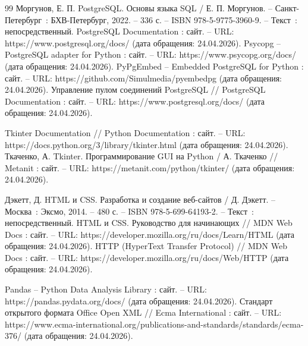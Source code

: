 \begin{thebibliography}{99}
	 Моргунов, Е. П. PostgreSQL. Основы языка SQL / Е. П. Моргунов. -- Санкт-Петербург~: БХВ-Петербург, 2022. -- 336 с. -- ISBN 978-5-9775-3960-9. -- Текст~: непосредственный.
	 PostgreSQL Documentation : сайт. -- URL: https://www.postgresql.org/docs/ (дата обращения: 24.04.2026).
	 Psycopg -- PostgreSQL adapter for Python : сайт. -- URL: https://www.psycopg.org/docs/ (дата обращения: 24.04.2026). 
	 PyPgEmbed -- Embedded PostgreSQL for Python : сайт. -- URL: https://github.com/Simulmedia/pyembedpg (дата обращения: 24.04.2026).
	 Управление пулом соединений PostgreSQL // PostgreSQL Documentation : сайт. -- URL: https://www.postgresql.org/docs/ (дата обращения: 24.04.2026). 
	
	 Tkinter Documentation // Python Documentation : сайт. -- URL: https://docs.python.org/3/library/tkinter.html (дата обращения: 24.04.2026). 
	 Ткаченко, А. Tkinter. Программирование GUI на Python / А. Ткаченко // Metanit : сайт. -- URL: https://metanit.com/python/tkinter/ (дата обращения: 24.04.2026). 
	
	 Дэкетт, Д. HTML и CSS. Разработка и создание веб-сайтов / Д. Дэкетт. -- Москва~: Эксмо, 2014. -- 480 с. -- ISBN 978-5-699-64193-2. -- Текст~: непосредственный.
	 HTML и CSS. Руководство для начинающих // MDN Web Docs : сайт. -- URL: https://developer.mozilla.org/ru/docs/Learn/HTML (дата обращения: 24.04.2026). 
	 HTTP (HyperText Transfer Protocol) // MDN Web Docs : сайт. -- URL: https://developer.mozilla.org/ru/docs/Web/HTTP (дата обращения: 24.04.2026). 
	
	 Pandas -- Python Data Analysis Library : сайт. -- URL: https://pandas.pydata.org/docs/ (дата обращения: 24.04.2026). 
	 Стандарт открытого формата Office Open XML // Ecma International : сайт. -- URL: https://www.ecma-international.org/publications-and-standards/standards/ecma-376/ (дата обращения: 24.04.2026). 
	

\end{thebibliography}
